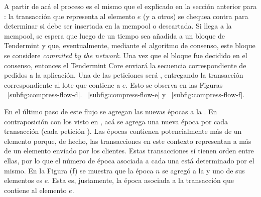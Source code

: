 %

A partir de acá el proceso es el mismo que el explicado en la sección anterior para \vanilla: la transacción
que representa al elemento $e$ (y a otros) se chequea contra \CheckTx para determinar si debe ser insertada
en la mempool o descartada.
%
Si llega a la mempool, se espera que luego de un tiempo sea añadida a un bloque de Tendermint y que, eventualmente,
mediante el algoritmo de consenso, este bloque se considere \textit{commited by the network}.
%
Una vez que el bloque fue decidido en el consenso, entonces el Tendermint Core enviará
la secuencia correspondiente de pedidos a la aplicación.
%
Una de las peticiones será \DeliverTx, entregando la transacción correspondiente al lote que contiene a $e$.
%
Esto se observa en las Figuras ~\ref{subfig:compress-flow-d}. ~\ref{subfig:compress-flow-e} y ~\ref{subfig:compress-flow-f}.

%
En el último paso de este flujo se agregan las nuevas épocas a la \setchain.
En contraposición con los visto en \vanilla, acá se agrega una nueva época por cada transacción (cada petición \DeliverTx).
Las épocas contienen potencialmente más de un elemento porque, de hecho, las transacciones en este contexto representan a más de un elemento
envíado por los clientes.
Estas transacciones sí tienen orden entre ellas, por lo que el número de época asociada a cada una está determinado por el mismo.
En la Figura (f) se muestra que la época $n$ se agregó a la \setchain y uno de sus elementos es $e$. Esta es, justamente, la época asociada
a la transacción que contiene al elemento $e$.


